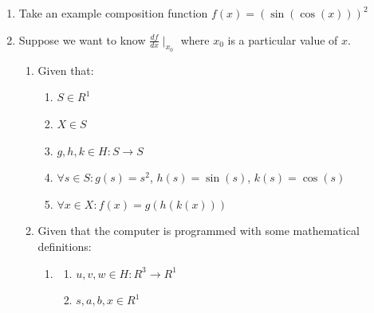 \documentclass[preprint,12pt]{elsarticle}
\begin{document}
\begin{enumerate}
\item Take an example composition function $f(x) = (\sin(\cos(x)))^2$\\

\item Suppose we want to know $\frac{df}{dx} \mid_{x_0}$ where $x_0$ is a particular value of $x$. \\

\begin{enumerate}
\item Given that: \\
\label{given}
\begin{enumerate}
\item $S \in R^1$ 
\item $X \in S$ 
\item $g, h, k \in H: S \rightarrow S$ 
\item $\forall s \in S : g(s) = {s}^2$, $h(s) = \sin(s)$, $k(s) = \cos(s)$ 
\item
\label{composition}
$\forall x \in X : f(x) = g(h(k(x)))$ \\
\end{enumerate}

\item Given that the computer is programmed with some mathematical definitions:\\
\begin{enumerate}
\item
\begin{enumerate}
\item
$u, v, w \in H: R^3 \rightarrow R^1$ \\
\item
$s,a,b,x \in R^1$\\
\end{enumerate}


\end{enumerate}
\end{enumerate}
\end{enumerate}
\end{document}
